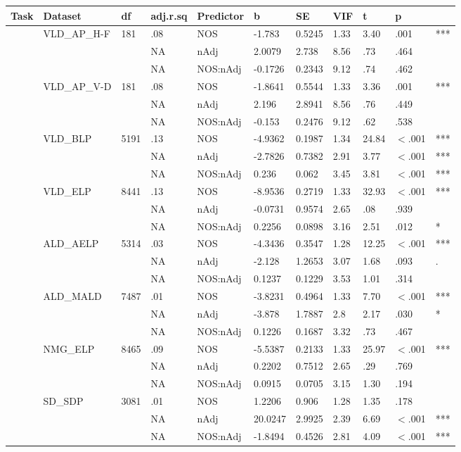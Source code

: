 \begin{table}[ht]
\centering
\begingroup\normalsize
\begin{tabular}{lllllllllll}
  \hline
Task & Dataset & df & adj.r.sq & Predictor & b & SE & VIF & t & p &  \\ 
  \hline
 & VLD\_AP\_H-F & 181 & .08 & NOS & -1.783 & 0.5245 & 1.33 & 3.40 & .001 & *** \\ 
   &  &  & NA & nAdj & 2.0079 & 2.738 & 8.56 & .73 & .464 &   \\ 
   &  &  & NA & NOS:nAdj & -0.1726 & 0.2343 & 9.12 & .74 & .462 &   \\ 
   & VLD\_AP\_V-D & 181 & .08 & NOS & -1.8641 & 0.5544 & 1.33 & 3.36 & .001 & *** \\ 
   &  &  & NA & nAdj & 2.196 & 2.8941 & 8.56 & .76 & .449 &   \\ 
   &  &  & NA & NOS:nAdj & -0.153 & 0.2476 & 9.12 & .62 & .538 &   \\ 
   & VLD\_BLP & 5191 & .13 & NOS & -4.9362 & 0.1987 & 1.34 & 24.84 & $<$.001 & *** \\ 
   &  &  & NA & nAdj & -2.7826 & 0.7382 & 2.91 & 3.77 & $<$.001 & *** \\ 
   &  &  & NA & NOS:nAdj & 0.236 & 0.062 & 3.45 & 3.81 & $<$.001 & *** \\ 
   & VLD\_ELP & 8441 & .13 & NOS & -8.9536 & 0.2719 & 1.33 & 32.93 & $<$.001 & *** \\ 
   &  &  & NA & nAdj & -0.0731 & 0.9574 & 2.65 & .08 & .939 &   \\ 
   &  &  & NA & NOS:nAdj & 0.2256 & 0.0898 & 3.16 & 2.51 & .012 & * \\ 
   & ALD\_AELP & 5314 & .03 & NOS & -4.3436 & 0.3547 & 1.28 & 12.25 & $<$.001 & *** \\ 
   &  &  & NA & nAdj & -2.128 & 1.2653 & 3.07 & 1.68 & .093 & . \\ 
   &  &  & NA & NOS:nAdj & 0.1237 & 0.1229 & 3.53 & 1.01 & .314 &   \\ 
   & ALD\_MALD & 7487 & .01 & NOS & -3.8231 & 0.4964 & 1.33 & 7.70 & $<$.001 & *** \\ 
   &  &  & NA & nAdj & -3.878 & 1.7887 & 2.8 & 2.17 & .030 & * \\ 
   &  &  & NA & NOS:nAdj & 0.1226 & 0.1687 & 3.32 & .73 & .467 &   \\ 
   & NMG\_ELP & 8465 & .09 & NOS & -5.5387 & 0.2133 & 1.33 & 25.97 & $<$.001 & *** \\ 
   &  &  & NA & nAdj & 0.2202 & 0.7512 & 2.65 & .29 & .769 &   \\ 
   &  &  & NA & NOS:nAdj & 0.0915 & 0.0705 & 3.15 & 1.30 & .194 &   \\ 
   & SD\_SDP & 3081 & .01 & NOS & 1.2206 & 0.906 & 1.28 & 1.35 & .178 &   \\ 
   &  &  & NA & nAdj & 20.0247 & 2.9925 & 2.39 & 6.69 & $<$.001 & *** \\ 
   &  &  & NA & NOS:nAdj & -1.8494 & 0.4526 & 2.81 & 4.09 & $<$.001 & *** \\ 
   \hline
\end{tabular}
\endgroup
\end{table}
